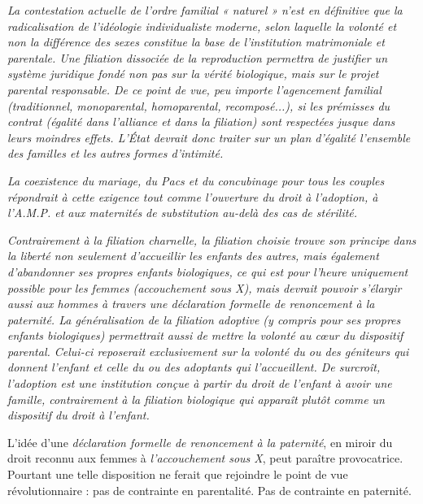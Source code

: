  \begin{displayquote}
[...]\emph{La contestation actuelle de l'ordre familial « naturel » n'est en définitive que la radicalisation de l'idéologie individualiste moderne, selon laquelle la volonté et non la différence des sexes constitue la base de l'institution matrimoniale et parentale. Une filiation dissociée de la reproduction permettra de justifier un système juridique fondé non pas sur la vérité biologique, mais sur le projet parental responsable. De ce point de vue, peu importe l'agencement familial (traditionnel, monoparental, homoparental, recomposé...), si les prémisses du contrat (égalité dans l'alliance et dans la filiation) sont respectées jusque dans leurs moindres effets. L'État devrait donc traiter sur un plan d'égalité l'ensemble des familles et les autres formes d'intimité.}
 
\emph{La coexistence du mariage, du Pacs et du concubinage pour tous les couples répondrait à cette exigence tout comme l'ouverture du droit à l'adoption, à l'A.M.P. et aux maternités de substitution au-delà des cas de stérilité.}
 
\emph{Contrairement à la filiation charnelle, la filiation choisie trouve son principe dans la liberté non seulement d'accueillir les enfants des autres, mais également d'abandonner ses propres enfants biologiques, ce qui est pour l'heure uniquement possible pour les femmes (accouchement sous X), mais devrait pouvoir s'élargir aussi aux hommes à travers une déclaration formelle de renoncement à la paternité. La généralisation de la filiation adoptive (y compris pour ses propres enfants biologiques) permettrait aussi de mettre la volonté au cœur du dispositif parental. Celui-ci reposerait exclusivement sur la volonté du ou des géniteurs qui donnent l'enfant et celle du ou des adoptants qui l'accueillent. De surcroît, l'adoption est une institution conçue à partir du droit de l'enfant à avoir une famille, contrairement à la filiation biologique qui apparaît plutôt comme un dispositif du droit à l'enfant.}
\end{displayquote}

 L'idée d'une {\emph{déclaration formelle de renoncement à la paternité}}, en miroir du droit reconnu aux femmes à \emph{l'accouchement sous X}, peut paraître provocatrice. Pourtant une telle disposition ne ferait que rejoindre le point de vue révolutionnaire : pas de contrainte en parentalité. Pas de contrainte en paternité.
 
 
 
 
 
